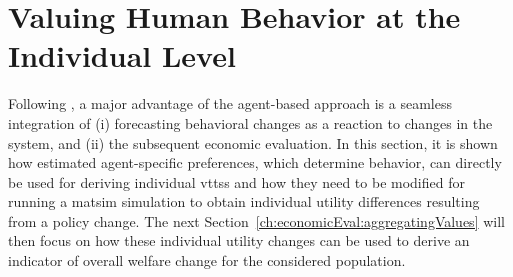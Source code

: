 %
%
%
%
%

\section{Valuing Human Behavior at the Individual Level}
\label{ch:economicEval:valuingBehavior}
Following \citet{deJongEtAl2007LogsumTRA}, a major advantage of the agent-based approach is a seamless integration of (i) forecasting behavioral changes as a reaction to changes in the system, and (ii) the subsequent economic evaluation.
%
In this section, it is shown how estimated agent-specific preferences, which determine behavior, can directly be used for deriving individual \glspl{vtts} and how they need to be modified for running a \gls{matsim} simulation to obtain individual utility differences resulting from a policy change.
%
The next Section~\ref{ch:economicEval:aggregatingValues} will then focus on how these individual utility changes can be used to derive an indicator of overall welfare change for the considered population.

